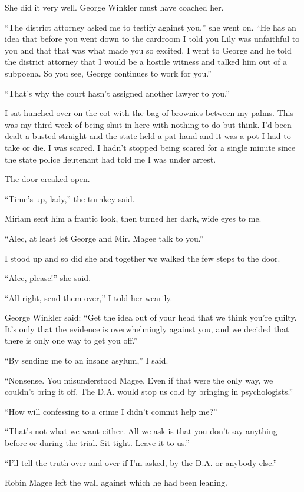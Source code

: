 \documentclass{novel}
\begin{document}
She did it very well. George Winkler must have coached her.

“The district attorney asked me to testify against you,” she went on. “He has an idea that before you went down to the cardroom I told you Lily was unfaithful to you and that that was what made you so excited. I went to George and he told the district attorney that I would be a hostile witness and talked him out of a subpoena. So you see, George continues to work for you.”

“That’s why the court hasn’t assigned another lawyer to you.”

I sat hunched over on the cot with the bag of brownies between my palms. This was my third week of being shut in here with nothing to do but think. I’d been dealt a busted straight and the state held a pat hand and it was a pot I had to take or die. I was scared. I hadn’t stopped being scared for a single minute since the state police lieutenant had told me I was under arrest.

The door creaked open. 

“Time’s up, lady,” the turnkey said.

Miriam sent him a frantic look, then turned her dark, wide eyes to me.

“Alec, at least let George and Mir. Magee talk to you.”

I stood up and so did she and together we walked the few steps to the door.

“Alec, please!” she said.

“All right, send them over,” I told her wearily.

George Winkler said: “Get the idea out of your head that we think you’re guilty. It’s only that the evidence is overwhelmingly against you, and we decided that there is only one way to get you off.”

“By sending me to an insane asylum,” I said.

“Nonsense. You misunderstood Magee. Even if that were the only way, we couldn’t bring it off. The D.A. would stop us cold by bringing in psychologists.”

“How will confessing to a crime I didn’t commit help me?”

“That’s not what we want either. All we ask is that you don’t say anything before or during the trial. Sit tight. Leave it to us.”

“I’ll tell the truth over and over if I’m asked, by the D.A. or anybody else.”

Robin Magee left the wall against which he had been leaning.
\end{document}
